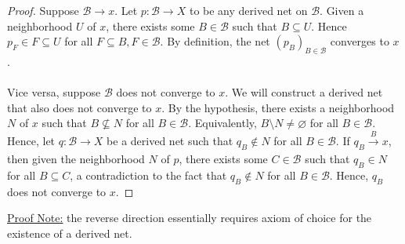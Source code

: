 \documentclass{treatise}
\begin{document}
\begin{proof}
Suppose $\mathcal{B} \to x$. Let $p: \mathcal{B} \to X$ to be any derived net on $\mathcal{B}$. Given a neighborhood $U$ of $x$, there exists some $B \in \mathcal{B}$ such that $B \subseteq U$. Hence $p_F \in F \subseteq U$ for all $F \subseteq B, F \in \mathcal{B}$. By definition, the net $(p_B)_{B \in \mathcal{B}}$ converges to $x$.
\\
\\
Vice versa, suppose $\mathcal{B}$ does not converge to $x$. We will construct a derived net that also does not converge to $x$. By the hypothesis, there exists a neighborhood $N$ of $x$ such that $B \not\subseteq N$ for all $B \in \mathcal{B}$. Equivalently, $B \setminus N \neq \varnothing$  for all $B \in \mathcal{B}$. Hence, let $q: \mathcal{B} \to X$ be a derived net such that $q_B \notin N$ for all $B \in \mathcal{B}$. If $q_B \xrightarrow[]{B} x$, then given the neighborhood $N$ of $p$, there exists some $C \in \mathcal{B}$ such that $q_B \in N$ for all $B \subseteq C$, a contradiction to the fact that $q_B \notin N$ for all $B \in \mathcal{B}$. Hence, $q_B$ does not converge to $x$.
\end{proof}
\underline{Proof Note:} the reverse direction essentially requires axiom of choice for the existence of a derived net.

\newpage
\end{document}
